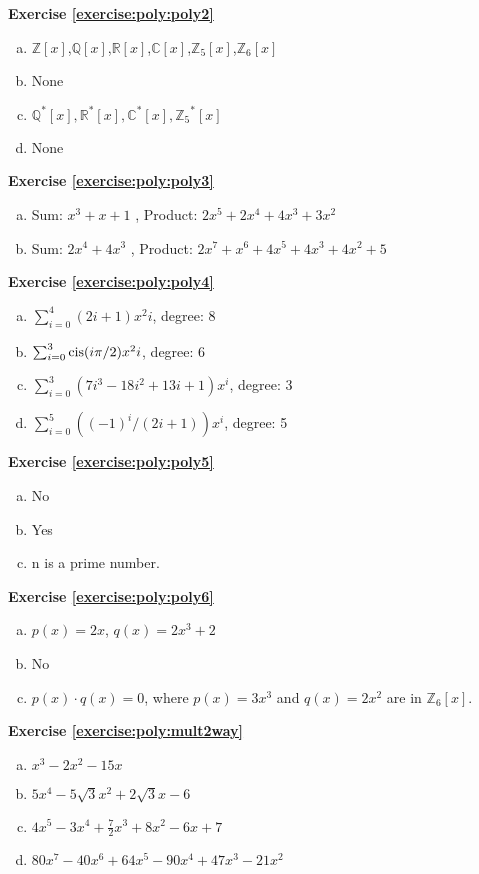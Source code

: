 \noindent\textbf{Exercise \ref{exercise:poly:poly2}}
\begin {enumerate} [(a)]
\item
 $\mathbb{Z}[x]$,$\mathbb{Q}[x]$,$\mathbb{R}[x]$,$\mathbb{C}[x]$,$\mathbb{Z}_5[x]$,$\mathbb{Z}_6[x]$
\item
 None
\item
 $\mathbb{Q}^*[x],\mathbb{R}^*[x], \mathbb{C}^*[x], {\mathbb{Z}_5}^*[x]$
\item
 None
\end {enumerate}

\noindent\textbf{Exercise \ref{exercise:poly:poly3}}
\begin {enumerate} [(a)]
\item
 Sum: $x^3+x+1$ , Product: $2x^5+2x^4+4x^3+3x^2$
\item
 Sum: $2x^4+4x^3$ , Product: $2x^7+x^6+4x^5+4x^3+4x^2+5$
\end {enumerate}

\noindent\textbf{Exercise \ref{exercise:poly:poly4}}
\begin {enumerate} [(a)]
\item
 $\sum_{i=0}^{4} (2i+1)x^2i$, degree: 8
\item
 $\sum_{i=0}^{3} \operatorname{cis}(i\pi/2)x^2i$, degree: 6
\item 
$\sum_{i=0}^{3} (7i^3-18i^2+13i+1)x^i$, degree: 3
\item
 $\sum_{i=0}^{5} ((-1)^i/(2i+1))x^i$, degree: 5
\end {enumerate}

\noindent\textbf{Exercise \ref{exercise:poly:poly5}}
\begin {enumerate} [(a)]
\item
 No
\item 
Yes
\item
 n is a prime number.
\end {enumerate}

\noindent\textbf{Exercise \ref{exercise:poly:poly6}}
\begin {enumerate} [(a)]
\item
 $p(x)=2x$, $q(x)=2x^3+2$
\item 
No
\item
 $p(x) \cdot q(x)=0$, where $p(x)=3x^3$ and $q(x)=2x^2$ are in $\mathbb{Z}_6[x]$.
\end {enumerate}

\noindent\textbf{Exercise \ref{exercise:poly:mult2way}}
\begin {enumerate} [(a)]
\item 
 $x^3-2x^2-15x$
\item
 $5x^4-5\sqrt{3}x^2+2\sqrt{3}x-6$
\item
$4x^5-3x^4+\frac{7}{2}x^3+8x^2-6x+7$
\item
$80x^7-40x^6+64x^5-90x^4+47x^3-21x^2$
\end {enumerate}

